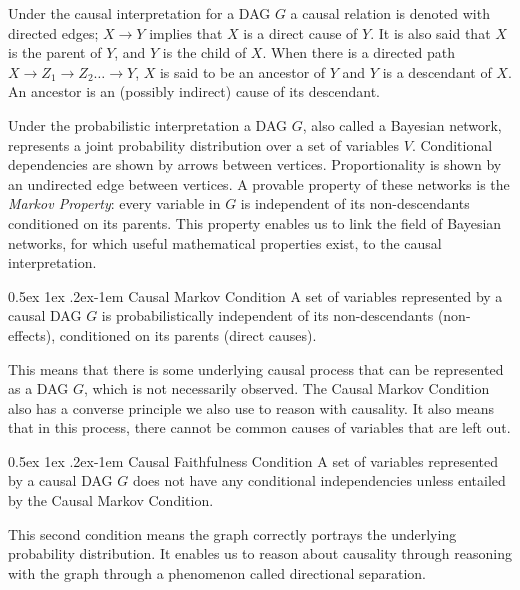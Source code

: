 \documentclass[a4paper, 10pt, english, onecolumn]{article}
\makeatletter
\renewcommand{\paragraph}{%
  \@startsection{paragraph}{4}%
  {\z@}{0.5ex \@plus 1ex \@minus .2ex}{-1em}%
  {\normalfont\normalsize\bfseries}%
}
\makeatother
\begin{document}
Under the causal interpretation for a DAG $G$ a causal relation is denoted with directed edges; $X \rightarrow Y$ implies that $X$ is a direct cause of $Y$.
It is also said that $X$ is the parent of $Y$, and $Y$ is the child of $X$. 
When there is a directed path $X \rightarrow Z_1 \rightarrow Z_2 \dots \rightarrow Y$, $X$ is said to be an ancestor of $Y$ and $Y$ is a descendant of $X$.
An ancestor is an (possibly indirect) cause of its descendant.

Under the probabilistic interpretation a DAG $G$, also called a Bayesian network, represents a joint probability distribution over a set of variables $V$.
Conditional dependencies are shown by arrows between vertices.
Proportionality is shown by an undirected edge between vertices.
A provable property of these networks is the \textit{Markov Property}: every variable in $G$ is independent of its non-descendants conditioned on its parents.
This property enables us to link the field of Bayesian networks, for which useful mathematical properties exist, to the causal interpretation.

\paragraph{Causal Markov Condition}
A set of variables represented by a causal DAG $G$ is probabilistically independent of its non-descendants (non-effects), conditioned on its parents (direct causes).

This means that there is some underlying causal process that can be represented as a DAG $G$, which is not necessarily observed.
The Causal Markov Condition also has a converse principle we also use to reason with causality.
It also means that in this process, there cannot be common causes of variables that are left out.

\paragraph{Causal Faithfulness Condition}
A set of variables represented by a causal DAG $G$ does not have any conditional independencies unless entailed by the Causal Markov Condition.

This second condition means the graph correctly portrays the underlying probability distribution.
It enables us to reason about causality through reasoning with the graph through a phenomenon called directional separation.
\end{document}
